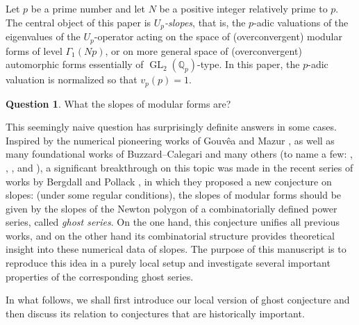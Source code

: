 \documentclass[12pt]{amsart}
\theoremstyle{definition}
\newtheorem{question}[subsection]{Question}
\numberwithin{equation}{subsection}
\def\QQ{\mathbb{Q}}
\DeclareMathOperator{\GL}{GL}
\begin{document}
Let $p$ be a prime number and let $N$ be a positive integer relatively prime to $p$. The central object of this paper is \emph{$U_p$-slopes}, that is, the $p$-adic valuations of the eigenvalues of the $U_p$-operator acting on the space of (overconvergent) modular forms of level $\Gamma_1(Np)$, or on more general space of (overconvergent) automorphic forms essentially of $\GL_2(\QQ_p)$-type. In this paper, the $p$-adic valuation is normalized so that $v_p(p) =1$.
\begin{question}
What the slopes of modular forms are?
\end{question}
This seemingly naive question has surprisingly definite answers in some cases.
Inspired by the numerical pioneering works of Gouv\^ea and Mazur \cite{gouvea-mazur, gouvea}, as well as many foundational works of Buzzard--Calegari and many others (to name a few: \cite{buzzard-calegari}, \cite{buzzard-slope}, \cite{clay}, and  \cite{loeffler-slope}), a significant breakthrough on this topic was made in the recent series of works by Bergdall and Pollack \cite{bergdall-pollack2, bergdall-pollack3}, in which they proposed a new
conjecture on slopes: (under some regular conditions), the slopes of modular forms should be given by the slopes of the Newton polygon of a combinatorially defined power series, called \emph{ghost series}. On the one hand, this conjecture unifies all previous works, and on the other hand its combinatorial structure provides theoretical insight into these numerical data of slopes. The purpose of this manuscript is to reproduce this idea in a purely local setup and investigate several important properties of the corresponding ghost series.

In what follows, we shall first introduce our local version of ghost conjecture and then discuss its relation to conjectures that are historically important.
\end{document}
